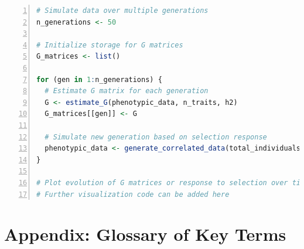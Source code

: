 \documentclass[12pt,a4paper]{article}
\begin{document}
\begin{lstlisting}[language=R, 
                   caption=Simulating Generations and Evolutionary Dynamics,
                   basicstyle=\ttfamily\footnotesize,
                   keywordstyle=\color{blue},
                   stringstyle=\color{red},
                   commentstyle=\color{green!60!black},
                   numbers=left,
                   numberstyle=\tiny\color{gray},
                   frame=single,
                   breaklines=true,
                   linewidth=0.95\textwidth,
                   columns=flexible,
                   xleftmargin=0.05\textwidth,
                   xrightmargin=0.05\textwidth]
# Simulate data over multiple generations
n_generations <- 50

# Initialize storage for G matrices
G_matrices <- list()

for (gen in 1:n_generations) {
  # Estimate G matrix for each generation
  G <- estimate_G(phenotypic_data, n_traits, h2)
  G_matrices[[gen]] <- G
  
  # Simulate new generation based on selection response
  phenotypic_data <- generate_correlated_data(total_individuals, n_traits, h2 = h2)
}

# Plot evolution of G matrices or response to selection over time
# Further visualization code can be added here
\end{lstlisting}

\section{Appendix: Glossary of Key Terms}
\end{document}
